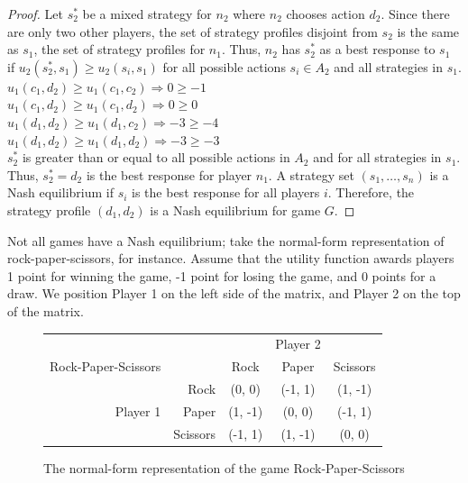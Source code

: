 \begin{proof}
  Let $s^*_2$ be a mixed strategy for $n_2$ where $n_2$ chooses action $d_2$. Since there are only two other players, the set of strategy profiles disjoint from $s_2$ is the same as $s_1$, the set of strategy profiles for $n_1$. Thus, $n_2$ has $s^*_2$ as a best response to $s_1$ if $u_2(s^*_2, s_1)\ge u_2(s_i, s_1)$ for all possible actions $s_i\in A_2$ and all strategies in $s_1$.\\
  
  $u_1(c_1, d_2)\ge u_1(c_1, c_2) \Rightarrow 0\ge -1$\\

  $u_1(c_1, d_2)\ge u_1(c_1, d_2) \Rightarrow 0\ge 0$\\

  $u_1(d_1, d_2)\ge u_1(d_1, c_2) \Rightarrow -3\ge -4$\\

  $u_1(d_1, d_2)\ge u_1(d_1, d_2) \Rightarrow -3\ge -3$\\

  $s^*_2$ is greater than or equal to all possible actions in $A_2$ and for all strategies in $s_1$. Thus, $s^*_2=d_2$ is the best response for player $n_1$. A strategy set $(s_1,\dots ,s_n)$ is a Nash equilibrium if $s_i$ is the best response for all players $i$. Therefore, the strategy profile $(d_1, d_2)$ is a Nash equilibrium for game $G$.
\end{proof}

Not all games have a Nash equilibrium; take the normal-form representation of rock-paper-scissors, for instance. Assume that the utility function awards players 1 point for winning the game, -1 point for losing the game, and 0 points for a draw. We position Player 1 on the left side of the matrix, and Player 2 on the top of the matrix.
\begin{figure}[H]
  \centering
  \begin{tabular}{r r | c | c | c |}
    &\multicolumn{1}{c}{}&\multicolumn{1}{c}{}&\multicolumn{1}{c}{Player 2}&\multicolumn{1}{c}{}\\
    Rock-Paper-Scissors &\multicolumn{1}{c}{}&\multicolumn{1}{c}{Rock}&\multicolumn{1}{c}{Paper}&\multicolumn{1}{c}{Scissors} \\ \cline{3-5}
    & Rock & (0, 0) & (-1, 1) & (1, -1) \\ \cline{3-5}
    Player 1 & Paper & (1, -1) & (0, 0) & (-1, 1) \\ \cline{3-5}
    & Scissors & (-1, 1) & (1, -1) & (0, 0) \\ \cline{3-5}
  \end{tabular}
  \caption{The normal-form representation of the game Rock-Paper-Scissors}
  \label{fig:RPS}
\end{figure}

